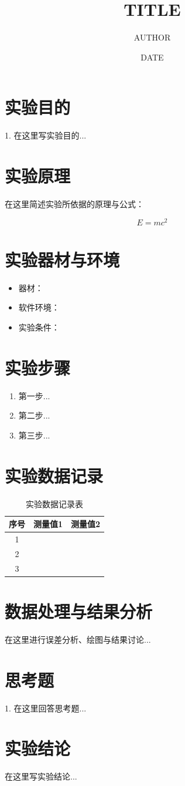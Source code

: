 \documentclass[12pt,a4paper]{article}
\title{{{TITLE}}}
\author{{{AUTHOR}}}
\date{{{DATE}}}
\begin{document}
\maketitle

\section{实验目的}
1. 在这里写实验目的...

\section{实验原理}
在这里简述实验所依据的原理与公式：

\begin{equation}
E = mc^2
\label{eq:example}
\end{equation}

\section{实验器材与环境}
\begin{itemize}
  \item 器材：
  \item 软件环境：
  \item 实验条件：
\end{itemize}

\section{实验步骤}
\begin{enumerate}
  \item 第一步...
  \item 第二步...
  \item 第三步...
\end{enumerate}

\section{实验数据记录}

\begin{table}[htbp]
\centering
\begin{tabular}{ccc}
\toprule
序号 & 测量值1 & 测量值2 \\
\midrule
1 & & \\
2 & & \\
3 & & \\
\bottomrule
\end{tabular}
\caption{实验数据记录表}
\label{tab:data}
\end{table}

\section{数据处理与结果分析}
在这里进行误差分析、绘图与结果讨论...

\section{思考题}
1. 在这里回答思考题...

\section{实验结论}
在这里写实验结论...
\end{document}
